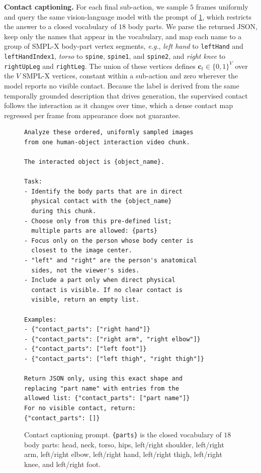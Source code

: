 \noindent\textbf{Contact captioning.}
For each final sub-action, we sample $5$ frames uniformly and query the same
vision-language model with the prompt of \cref{fig:supp_prompt_contact}, which
restricts the answer to a closed vocabulary of $18$ body parts.  We parse the
returned JSON, keep only the names that appear in the vocabulary, and map each
name to a group of SMPL-X body-part vertex segments, \textit{e.g.}, \textit{left
hand} to \texttt{leftHand} and \texttt{leftHandIndex1}, \textit{torso} to
\texttt{spine}, \texttt{spine1}, and \texttt{spine2}, and \textit{right knee} to
\texttt{rightUpLeg} and \texttt{rightLeg}.  The union of these vertices defines
$\mathbf{c}_t\in\{0,1\}^{V}$ over the $V$ SMPL-X vertices, constant within a
sub-action and zero wherever the model reports no visible contact.  Because the
label is derived from the same temporally grounded description that drives
generation, the supervised contact follows the interaction as it changes over
time, which a dense contact map regressed per frame from appearance does not
guarantee.

\begin{figure}[t]
\centering
\small
\begin{verbatim}
Analyze these ordered, uniformly sampled images
from one human-object interaction video chunk.

The interacted object is {object_name}.

Task:
- Identify the body parts that are in direct
  physical contact with the {object_name}
  during this chunk.
- Choose only from this pre-defined list;
  multiple parts are allowed: {parts}
- Focus only on the person whose body center is
  closest to the image center.
- "left" and "right" are the person's anatomical
  sides, not the viewer's sides.
- Include a part only when direct physical
  contact is visible. If no clear contact is
  visible, return an empty list.

Examples:
- {"contact_parts": ["right hand"]}
- {"contact_parts": ["right arm", "right elbow"]}
- {"contact_parts": ["left foot"]}
- {"contact_parts": ["left thigh", "right thigh"]}

Return JSON only, using this exact shape and
replacing "part name" with entries from the
allowed list: {"contact_parts": ["part name"]}
For no visible contact, return:
{"contact_parts": []}
\end{verbatim}
\caption{Contact captioning prompt.  \texttt{\{parts\}} is the closed
vocabulary of $18$ body parts: head, neck, torso, hips, left/right shoulder,
left/right arm, left/right elbow, left/right hand, left/right thigh, left/right
knee, and left/right foot.}
\label{fig:supp_prompt_contact}
\end{figure}

